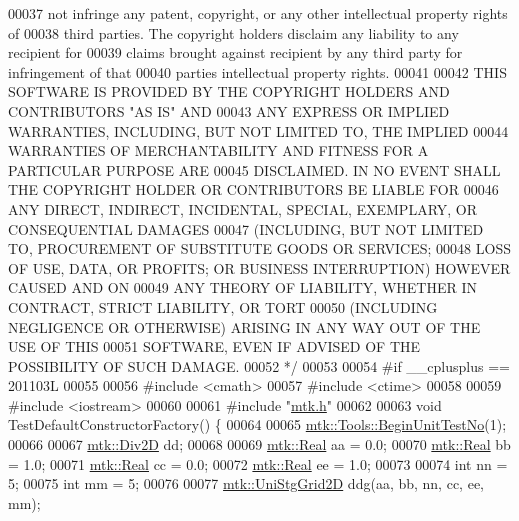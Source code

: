 \begin{DoxyCode}
00037 \textcolor{comment}{not infringe any patent, copyright, or any other intellectual property rights of}
00038 \textcolor{comment}{third parties. The copyright holders disclaim any liability to any recipient for}
00039 \textcolor{comment}{claims brought against recipient by any third party for infringement of that}
00040 \textcolor{comment}{parties intellectual property rights.}
00041 \textcolor{comment}{}
00042 \textcolor{comment}{THIS SOFTWARE IS PROVIDED BY THE COPYRIGHT HOLDERS AND CONTRIBUTORS "AS IS" AND}
00043 \textcolor{comment}{ANY EXPRESS OR IMPLIED WARRANTIES, INCLUDING, BUT NOT LIMITED TO, THE IMPLIED}
00044 \textcolor{comment}{WARRANTIES OF MERCHANTABILITY AND FITNESS FOR A PARTICULAR PURPOSE ARE}
00045 \textcolor{comment}{DISCLAIMED. IN NO EVENT SHALL THE COPYRIGHT HOLDER OR CONTRIBUTORS BE LIABLE FOR}
00046 \textcolor{comment}{ANY DIRECT, INDIRECT, INCIDENTAL, SPECIAL, EXEMPLARY, OR CONSEQUENTIAL DAMAGES}
00047 \textcolor{comment}{(INCLUDING, BUT NOT LIMITED TO, PROCUREMENT OF SUBSTITUTE GOODS OR SERVICES;}
00048 \textcolor{comment}{LOSS OF USE, DATA, OR PROFITS; OR BUSINESS INTERRUPTION) HOWEVER CAUSED AND ON}
00049 \textcolor{comment}{ANY THEORY OF LIABILITY, WHETHER IN CONTRACT, STRICT LIABILITY, OR TORT}
00050 \textcolor{comment}{(INCLUDING NEGLIGENCE OR OTHERWISE) ARISING IN ANY WAY OUT OF THE USE OF THIS}
00051 \textcolor{comment}{SOFTWARE, EVEN IF ADVISED OF THE POSSIBILITY OF SUCH DAMAGE.}
00052 \textcolor{comment}{*/}
00053 
00054 \textcolor{preprocessor}{#if \_\_cplusplus == 201103L}
00055 
00056 \textcolor{preprocessor}{#include <cmath>}
00057 \textcolor{preprocessor}{#include <ctime>}
00058 
00059 \textcolor{preprocessor}{#include <iostream>}
00060 
00061 \textcolor{preprocessor}{#include "\hyperlink{mtk_8h}{mtk.h}"}
00062 
00063 \textcolor{keywordtype}{void} TestDefaultConstructorFactory() \{
00064 
00065   \hyperlink{classmtk_1_1Tools_a26ee906d28523378522a75e25c3a4e19}{mtk::Tools::BeginUnitTestNo}(1);
00066 
00067   \hyperlink{classmtk_1_1Div2D}{mtk::Div2D} dd;
00068 
00069   \hyperlink{group__c01-roots_gac080bbbf5cbb5502c9f00405f894857d}{mtk::Real} aa = 0.0;
00070   \hyperlink{group__c01-roots_gac080bbbf5cbb5502c9f00405f894857d}{mtk::Real} bb = 1.0;
00071   \hyperlink{group__c01-roots_gac080bbbf5cbb5502c9f00405f894857d}{mtk::Real} cc = 0.0;
00072   \hyperlink{group__c01-roots_gac080bbbf5cbb5502c9f00405f894857d}{mtk::Real} ee = 1.0;
00073 
00074   \textcolor{keywordtype}{int} nn = 5;
00075   \textcolor{keywordtype}{int} mm = 5;
00076 
00077   \hyperlink{classmtk_1_1UniStgGrid2D}{mtk::UniStgGrid2D} ddg(aa, bb, nn, cc, ee, mm);

\end{DoxyCode}
